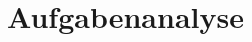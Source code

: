 \chapter{Aufgabenanalyse}
\label{Aufgabenanalyse}





















































